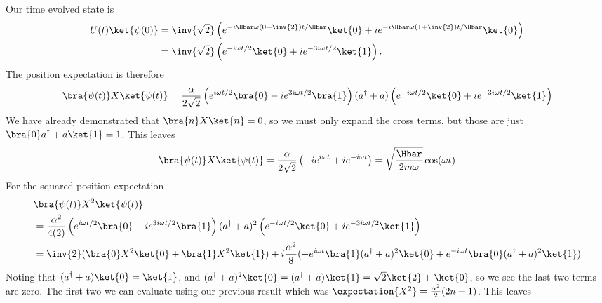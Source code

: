 {
Our time evolved state is
\begin{equation}\label{eqn:qmIexamPractice2008Dec:3:300}
\begin{aligned}
U(t) \ket{\psi(0)} 
&= \inv{\sqrt{2}}
\left(
e^{-i \Hbar \omega \left( 0 + \inv{2} \right) t/\Hbar } \ket{0}
+ i e^{-i \Hbar \omega \left( 1 + \inv{2} \right) t/\Hbar } \ket{0}
\right) \\
&=
\inv{\sqrt{2}}
\left(
e^{-i \omega t/2 } \ket{0}
+ i e^{- 3 i \omega t/2 } \ket{1}
\right).
\end{aligned}
\end{equation}
%
The position expectation is therefore
\begin{equation}\label{eqn:qmIexamPractice:750}
\begin{aligned}
\bra{\psi(t)} X \ket{\psi(t)}
&=
\frac{\alpha}{2 \sqrt{2}}
\left(
e^{i \omega t/2 } \bra{0}
- i e^{ 3 i \omega t/2 } \bra{1}
\right)
(a^\dagger + a)
\left(
e^{-i \omega t/2 } \ket{0}
+ i e^{- 3 i \omega t/2 } \ket{1}
\right) \\
\end{aligned}
\end{equation}
%
We have already demonstrated that \(\bra{n} X \ket{n} = 0\), so we must only expand the cross terms, but those are just \(\bra{0} a^\dagger + a \ket{1} = 1\).  This leaves
%
\begin{equation}\label{eqn:qmIexamPractice2008Dec:3:310}
\bra{\psi(t)} X \ket{\psi(t)}
=
\frac{\alpha}{2 \sqrt{2}}
\left( -i e^{i \omega t} + i e^{-i \omega t} \right)
=
\sqrt{\frac{\Hbar}{2 m \omega}} \cos(\omega t)
\end{equation}
%
For the squared position expectation
\begin{equation}\label{eqn:qmIexamPractice:770}
\begin{aligned}
&\bra{\psi(t)} X^2 \ket{\psi(t)} \\
&=
\frac{\alpha^2}{4 (2)}
\left(
e^{i \omega t/2 } \bra{0}
- i e^{ 3 i \omega t/2 } \bra{1}
\right)
(a^\dagger + a)^2
\left(
e^{-i \omega t/2 } \ket{0}
+ i e^{- 3 i \omega t/2 } \ket{1}
\right) \\
&=
\inv{2} ( \bra{0} X^2 \ket{0} + \bra{1} X^2 \ket{1} )
+ i \frac{\alpha^2 }{8} (
- e^{ i \omega t} \bra{1} (a^\dagger + a)^2 \ket{0}
+ e^{ -i \omega t} \bra{0} (a^\dagger + a)^2 \ket{1}
)
\end{aligned}
\end{equation}
%
Noting that \((a^\dagger + a) \ket{0} = \ket{1}\), and \((a^\dagger + a)^2 \ket{0} = (a^\dagger + a)\ket{1} = \sqrt{2} \ket{2} + \ket{0}\), so we see the last two terms are zero.  The first two we can evaluate using our previous result  which was \(\expectation{X^2} = \frac{\alpha^2}{2} (2n + 1)\).  This leaves
}
